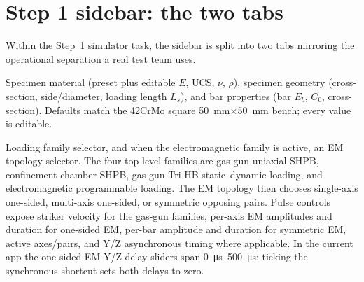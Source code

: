 \documentclass[11pt,a4paper,openany]{book}
\providecommand{\SI}[2]{\qty{#1}{#2}}
\providecommand{\SIrange}[3]{\qtyrange{#1}{#2}{#3}}
\theoremstyle{handbook}
\newcommand{\Cz}{C_0}
\newcommand{\Ls}{L_s}
\begin{document}
\section{Step 1 sidebar: the two tabs}

Within the Step~1 simulator task, the sidebar is split into two tabs
mirroring the operational separation a real test team uses.

\begin{description}[leftmargin=2em,style=nextline]
  \item[Experimental setup]
    Specimen material (preset plus editable $E$, UCS, $\nu$, $\rho$),
    specimen geometry (cross-section, side/diameter, loading length
    $\Ls$), and bar properties (bar $E_b$, $\Cz$, cross-section).
    Defaults match the 42CrMo square \SI{50}{mm}$\times$\SI{50}{mm}
    bench; every value is editable.
  \item[Test loading]
    Loading family selector, and when the electromagnetic family is active,
    an EM topology selector. The four top-level families are gas-gun
    uniaxial SHPB, confinement-chamber SHPB, gas-gun Tri-HB
    static--dynamic loading, and electromagnetic programmable loading. The
    EM topology then chooses single-axis one-sided, multi-axis one-sided, or
    symmetric opposing pairs. Pulse controls expose striker velocity for the
    gas-gun families, per-axis EM amplitudes and duration for one-sided EM,
    per-bar amplitude and duration for symmetric EM, active axes/pairs, and
    Y/Z asynchronous timing where applicable. In the current app the
    one-sided EM Y/Z delay sliders span \SIrange{0}{500}{\micro s}; ticking
    the synchronous shortcut sets both delays to zero.


\end{description}
\end{document}
